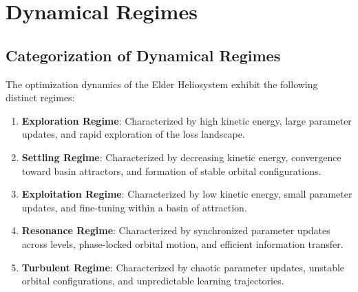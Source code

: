 \section{Dynamical Regimes}

\subsection{Categorization of Dynamical Regimes}

\begin{theorem}
The optimization dynamics of the Elder Heliosystem exhibit the following distinct regimes:
\begin{enumerate}
    \item \textbf{Exploration Regime}: Characterized by high kinetic energy, large parameter updates, and rapid exploration of the loss landscape.
    \item \textbf{Settling Regime}: Characterized by decreasing kinetic energy, convergence toward basin attractors, and formation of stable orbital configurations.
    \item \textbf{Exploitation Regime}: Characterized by low kinetic energy, small parameter updates, and fine-tuning within a basin of attraction.
    \item \textbf{Resonance Regime}: Characterized by synchronized parameter updates across levels, phase-locked orbital motion, and efficient information transfer.
    \item \textbf{Turbulent Regime}: Characterized by chaotic parameter updates, unstable orbital configurations, and unpredictable learning trajectories.
\end{enumerate}
\end{theorem}

